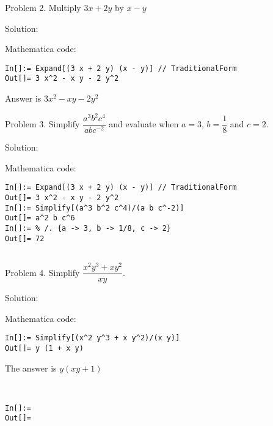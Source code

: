 \documentclass{article}
\begin{document}
Problem 2. Multiply $3x+2y$ by $x-y$

Solution:

Mathematica code:
\begin{verbatim}
In[]:= Expand[(3 x + 2 y) (x - y)] // TraditionalForm
Out[]= 3 x^2 - x y - 2 y^2
\end{verbatim}

Answer is $3x^{2}-xy-2y^{2}$

\bigskip 

Problem 3. Simplify $\dfrac{a^{3}b^{2}c^{4}}{abc^{-2}}$ and evaluate when $%
a=3$, $b=\dfrac{1}{8}$ and $c=2$.

Solution:

Mathematica code:
\begin{verbatim}
In[]:= Expand[(3 x + 2 y) (x - y)] // TraditionalForm
Out[]= 3 x^2 - x y - 2 y^2
In[]:= Simplify[(a^3 b^2 c^4)/(a b c^-2)]
Out[]= a^2 b c^6
In[]:= % /. {a -> 3, b -> 1/8, c -> 2}
Out[]= 72
 
\end{verbatim}

Problem 4. Simplify $\dfrac{x^{2}y^{3}+xy^{2}}{xy}$.

Solution:

Mathematica code:
\begin{verbatim}
In[]:= Simplify[(x^2 y^3 + x y^2)/(x y)]
Out[]= y (1 + x y)
\end{verbatim}

The answer is $y\left( xy+1\right) $
\begin{verbatim}
 
 
In[]:= 
Out[]= 
\end{verbatim}
\end{document}
